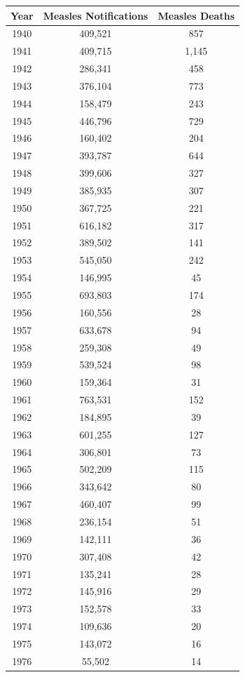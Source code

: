 \documentclass[a4paper,11pt] {scrartcl}
\begin{document}
\begin{table} [hp]
\centering
\begin{tabular}{c c c}
\toprule
Year & Measles Notifications & Measles Deaths \\ 
\midrule
1940 & 409,521 & 857 \\ 
1941 & 409,715 & 1,145 \\ 
1942 & 286,341 & 458 \\ 
1943 & 376,104 & 773 \\ 
1944 & 158,479 & 243 \\ 
1945 & 446,796 & 729 \\ 
1946 & 160,402 & 204 \\ 
1947 & 393,787 & 644 \\ 
1948 & 399,606 & 327 \\ 
1949 & 385,935 & 307 \\ 
1950 & 367,725 & 221 \\ 
1951 & 616,182 & 317 \\ 
1952 & 389,502 & 141 \\ 
1953 & 545,050 & 242 \\ 
1954 & 146,995 & 45 \\ 
1955 & 693,803 & 174 \\ 
1956 & 160,556 & 28 \\ 
1957 & 633,678 & 94 \\ 
1958 & 259,308 & 49 \\ 
1959 & 539,524 & 98 \\ 
1960 & 159,364 & 31 \\ 
1961 & 763,531 & 152 \\ 
1962 & 184,895 & 39 \\ 
1963 & 601,255 & 127 \\ 
1964 & 306,801 & 73 \\ 
1965 & 502,209 & 115 \\ 
1966 & 343,642 & 80 \\ 
1967 & 460,407 & 99 \\ 
1968 & 236,154 & 51 \\ 
1969 & 142,111 & 36 \\ 
1970 & 307,408 & 42 \\ 
1971 & 135,241 & 28 \\ 
1972 & 145,916 & 29 \\ 
1973 & 152,578 & 33 \\ 
1974 & 109,636 & 20 \\ 
1975 & 143,072 & 16 \\ 
1976 & 55,502 & 14 \\ 

\end{tabular}
\end{table}
\end{document}

